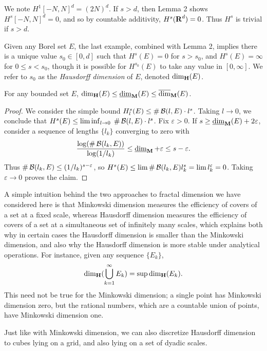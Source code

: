 \begin{example}
	We note $H^1[-N,N]^d = (2N)^d$. If $s > d$, then Lemma 2 shows $H^s[-N,N]^d = 0$, and so by countable additivity, $H^s(\operatorname{\mathbf{R}}^d) = 0$. Thus $H^s$ is trivial if $s > d$.
\end{example}

Given any Borel set $E$, the last example, combined with Lemma 2, implies there is a unique value $s_0 \in [0,d]$ such that $H^s(E) = 0$ for $s > s_0$, and $H^s(E) = \infty$ for $0 \leq s < s_0$, though it is possible for $H^{s_0}(E)$ to take any value in $[0,\infty]$. We refer to $s_0$ as the \emph{Hausdorff dimension} of $E$, denoted $\operatorname{\dim_{\mathbf{H}}}(E)$.

\begin{theorem}
	For any bounded set $E$, $\operatorname{\dim_{\mathbf{H}}}(E) \leq \operatorname{\underline{\dim}_{\mathbf{M}}}(E) \leq \operatorname{\overline{\dim}_{\mathbf{M}}}(E)$.
\end{theorem}
\begin{proof}
	We consider the simple bound $H^s_l(E) \leq \# \operatorname{\mathcal{B}}(l,E) \cdot l^s$. Taking $l \to 0$, we conclude that $H^s(E) \leq \liminf_{l \to 0}\; \# \operatorname{\mathcal{B}}(l,E) \cdot l^s$. Fix $\varepsilon > 0$. If $s \geq \operatorname{\underline{\dim}_{\mathbf{M}}}(E) + 2\varepsilon$, consider a sequence of lengths $\{ l_k \}$ converging to zero with
	\[ \frac{\log(\# \operatorname{\mathcal{B}}(l_k,E))}{\log(1/l_k)} \leq \operatorname{\underline{\dim}_{\mathbf{M}}} + \varepsilon \leq s - \varepsilon. \]
	Thus $\# \operatorname{\mathcal{B}}(l_k,E) \leq (1/l_k)^{s - \varepsilon}$, so $H^s(E) \leq \lim \# \operatorname{\mathcal{B}}(l_k,E) l_k^s = \lim l_k^\varepsilon = 0$. Taking $\varepsilon \to 0$ proves the claim.
\end{proof}

A simple intuition behind the two approaches to fractal dimension we have considered here is that Minkowski dimension measures the efficiency of covers of a set at a fixed scale, whereas Hausdorff dimension measures the efficiency of covers of a set at a simultaneous set of infinitely many scales, which explains both why in certain cases the Hausdorff dimension is smaller than the Minkowski dimension, and also why the Hausdorff dimension is more stable under analytical operations. For instance, given any sequence $\{ E_k \}$,
%
\[ \operatorname{\dim_{\mathbf{H}}}(\bigcup_{k = 1}^\infty E_k) = \sup \operatorname{\dim_{\mathbf{H}}}(E_k). \]
%
This need not be true for the Minkowski dimension; a single point has Minkowski dimension zero, but the rational numbers, which are a countable union of points, have Minkowski dimension one.

Just like with Minkowski dimension, we can also discretize Hausdorff dimension to cubes lying on a grid, and also lying on a set of dyadic scales.


